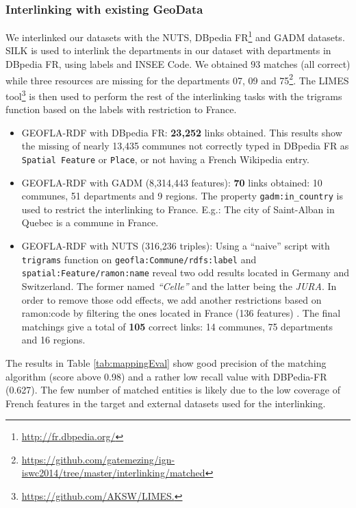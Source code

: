 \subsubsection{Interlinking with existing GeoData} \label{sec:mapping}
We interlinked our datasets with the NUTS, DBpedia FR\footnote{\url{http://fr.dbpedia.org/}} and GADM datasets. SILK \cite{jentzsch2010silk} is used to interlink the departments in our dataset with departments in DBpedia FR, using labels and INSEE Code. We obtained $93$ matches (all correct) while three resources are missing for the departments 07, 09 and 75\footnote{\url{https://github.com/gatemezing/ign-iswc2014/tree/master/interlinking/matched}}. The
LIMES tool\footnote{\url{https://github.com/AKSW/LIMES.}} is then used to perform the rest of the interlinking tasks \cite{ngon13} with the trigrams function based on the labels with restriction to France.

\begin{itemize}
 \item GEOFLA-RDF with DBpedia FR: \textbf{23,252} links obtained. This results show the missing of nearly 13,435 communes not correctly typed in DBpedia FR as \texttt{Spatial Feature} or \texttt{Place}, or not having a French Wikipedia entry.
 \item GEOFLA-RDF with GADM (8,314,443 features): \textbf{70} links obtained: 10 communes, 51 departments and 9 regions. The property \texttt{gadm:in\_country} is used to restrict the interlinking to France. E.g.: The city of Saint-Alban in Quebec is a commune in France.
 \item GEOFLA-RDF with NUTS (316,236 triples): Using a ``naive'' script with \texttt{trigrams} function on \texttt{geofla:Commune/rdfs:label} and \texttt{spatial:Feature/ramon:name} reveal two odd results located in Germany and Switzerland. The former named \textit{``Celle''} and the latter being the \textit{JURA}. In order to remove those odd effects, we add another restrictions based on \textsf{ramon:code} by filtering the ones located in France (136 features) . The final matchings give a total of \textbf{105} correct links: 14 communes, 75 departments and 16 regions.
\end{itemize}

The results in Table \ref{tab:mappingEval} show good precision of the matching algorithm (score above 0.98) and a rather low recall value with DBPedia-FR (0.627). The few number of matched entities is likely due to the low coverage of French features in the target and external datasets used for the interlinking.


